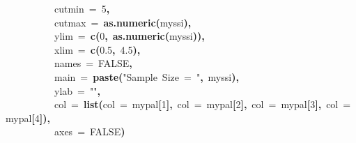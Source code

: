 \documentclass{article}
\makeatletter
\newcommand{\hlnumber}[1]{\textcolor[rgb]{0,0,0}{#1}}%
\newcommand{\hlfunctioncall}[1]{\textcolor[rgb]{0.501960784313725,0,0.329411764705882}{\textbf{#1}}}%
\newcommand{\hlstring}[1]{\textcolor[rgb]{0.6,0.6,1}{#1}}%
\newcommand{\hlkeyword}[1]{\textcolor[rgb]{0,0,0}{\textbf{#1}}}%
\newcommand{\hlargument}[1]{\textcolor[rgb]{0.690196078431373,0.250980392156863,0.0196078431372549}{#1}}%
\newcommand{\hlsymbol}[1]{\textcolor[rgb]{0,0,0}{#1}}%
\newcommand{\hlstd}[1]{\textcolor[rgb]{0,0,0}{#1}}%
\newenvironment{kframe}{%
 \def\FrameCommand##1{\hskip\@totalleftmargin \hskip-\fboxsep
 \colorbox{shadecolor}{##1}\hskip-\fboxsep
     \hskip-\linewidth \hskip-\@totalleftmargin \hskip\columnwidth}%
 \MakeFramed {\advance\hsize-\width
   \@totalleftmargin\z@ \linewidth\hsize
   \@setminipage}}%
 {\par\unskip\endMakeFramed}
\newenvironment{knitrout}{}{} %
\makeatother
\begin{document}
\begin{knitrout}
\begin{kframe}
\begin{flushleft}
\hlstd{}{\ }{\ }{\ }{\ }{\ }{\ }{\ }{\ }{\ }{\ }{\ }\hlargument{cutmin}{\ }\hlargument{=}{\ }\hlnumber{5}\hlkeyword{,}\hspace*{\fill}\\
\hlstd{}{\ }{\ }{\ }{\ }{\ }{\ }{\ }{\ }{\ }{\ }{\ }\hlargument{cutmax}{\ }\hlargument{=}{\ }\hlfunctioncall{as.numeric}\hlkeyword{(}\hlsymbol{myssi}\hlkeyword{)}\hlkeyword{,}\hspace*{\fill}\\
\hlstd{}{\ }{\ }{\ }{\ }{\ }{\ }{\ }{\ }{\ }{\ }{\ }\hlargument{ylim}{\ }\hlargument{=}{\ }\hlfunctioncall{c}\hlkeyword{(}\hlnumber{0}\hlkeyword{,}{\ }\hlfunctioncall{as.numeric}\hlkeyword{(}\hlsymbol{myssi}\hlkeyword{)}\hlkeyword{)}\hlkeyword{,}\hspace*{\fill}\\
\hlstd{}{\ }{\ }{\ }{\ }{\ }{\ }{\ }{\ }{\ }{\ }{\ }\hlargument{xlim}{\ }\hlargument{=}{\ }\hlfunctioncall{c}\hlkeyword{(}\hlnumber{0.5}\hlkeyword{,}{\ }\hlnumber{4.5}\hlkeyword{)}\hlkeyword{,}\hspace*{\fill}\\
\hlstd{}{\ }{\ }{\ }{\ }{\ }{\ }{\ }{\ }{\ }{\ }{\ }\hlargument{names}{\ }\hlargument{=}{\ }\hlnumber{FALSE}\hlkeyword{,}\hspace*{\fill}\\
\hlstd{}{\ }{\ }{\ }{\ }{\ }{\ }{\ }{\ }{\ }{\ }{\ }\hlargument{main}{\ }\hlargument{=}{\ }\hlfunctioncall{paste}\hlkeyword{(}\hlstring{"{}Sample{\ }Size{\ }={\ }"{}}\hlkeyword{,}{\ }\hlsymbol{myssi}\hlkeyword{)}\hlkeyword{,}\hspace*{\fill}\\
\hlstd{}{\ }{\ }{\ }{\ }{\ }{\ }{\ }{\ }{\ }{\ }{\ }\hlargument{ylab}{\ }\hlargument{=}{\ }\hlstring{"{}"{}}\hlkeyword{,}\hspace*{\fill}\\
\hlstd{}{\ }{\ }{\ }{\ }{\ }{\ }{\ }{\ }{\ }{\ }{\ }\hlargument{col}{\ }\hlargument{=}{\ }\hlfunctioncall{list}\hlkeyword{(}\hlargument{col}{\ }\hlargument{=}{\ }\hlsymbol{mypal}\hlkeyword{[}\hlnumber{1}\hlkeyword{]}\hlkeyword{,}{\ }\hlargument{col}{\ }\hlargument{=}{\ }\hlsymbol{mypal}\hlkeyword{[}\hlnumber{2}\hlkeyword{]}\hlkeyword{,}{\ }\hlargument{col}{\ }\hlargument{=}{\ }\hlsymbol{mypal}\hlkeyword{[}\hlnumber{3}\hlkeyword{]}\hlkeyword{,}{\ }\hlargument{col}{\ }\hlargument{=}{\ }\hlsymbol{mypal}\hlkeyword{[}\hlnumber{4}\hlkeyword{]}\hlkeyword{)}\hlkeyword{,}\hspace*{\fill}\\
\hlstd{}{\ }{\ }{\ }{\ }{\ }{\ }{\ }{\ }{\ }{\ }{\ }\hlargument{axes}{\ }\hlargument{=}{\ }\hlnumber{FALSE}\hlkeyword{)}\hspace*{\fill}\\

\end{flushleft}
\end{kframe}
\end{knitrout}
\end{document}
